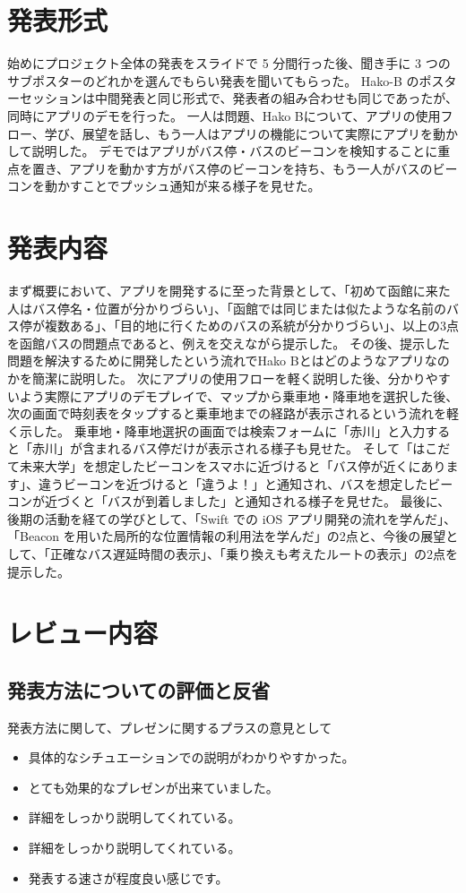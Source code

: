 \documentclass[openany,11pt,papersize]{jsbook}
\begin{document}
\section{発表形式}
始めにプロジェクト全体の発表をスライドで 5 分間行った後、聞き手に 3 つのサブポスターのどれかを選んでもらい発表を聞いてもらった。
Hako-B のポスターセッションは中間発表と同じ形式で、発表者の組み合わせも同じであったが、同時にアプリのデモを行った。
一人は問題、Hako Bについて、アプリの使用フロー、学び、展望を話し、もう一人はアプリの機能について実際にアプリを動かして説明した。
デモではアプリがバス停・バスのビーコンを検知することに重点を置き、アプリを動かす方がバス停のビーコンを持ち、もう一人がバスのビーコンを動かすことでプッシュ通知が来る様子を見せた。


\section{発表内容}
まず概要において、アプリを開発するに至った背景として、「初めて函館に来た人はバス停名・位置が分かりづらい」、「函館では同じまたは似たような名前のバス停が複数ある」、「目的地に行くためのバスの系統が分かりづらい」、以上の3点を函館バスの問題点であると、例えを交えながら提示した。
その後、提示した問題を解決するために開発したという流れでHako Bとはどのようなアプリなのかを簡潔に説明した。
次にアプリの使用フローを軽く説明した後、分かりやすいよう実際にアプリのデモプレイで、マップから乗車地・降車地を選択した後、次の画面で時刻表をタップすると乗車地までの経路が表示されるという流れを軽く示した。
乗車地・降車地選択の画面では検索フォームに「赤川」と入力すると「赤川」が含まれるバス停だけが表示される様子も見せた。
そして「はこだて未来大学」を想定したビーコンをスマホに近づけると「バス停が近くにあります」、違うビーコンを近づけると「違うよ！」と通知され、バスを想定したビーコンが近づくと「バスが到着しました」と通知される様子を見せた。
最後に、後期の活動を経ての学びとして、「Swift での iOS アプリ開発の流れを学んだ」、「Beacon を用いた局所的な位置情報の利用法を学んだ」の2点と、今後の展望として、「正確なバス遅延時間の表示」、「乗り換えも考えたルートの表示」の2点を提示した。


\section{レビュー内容}
\subsection{発表方法についての評価と反省}
発表方法に関して、プレゼンに関するプラスの意見として
\begin{itemize}

\item 具体的なシチュエーションでの説明がわかりやすかった。
\item とても効果的なプレゼンが出来ていました。
\item 詳細をしっかり説明してくれている。
\item 詳細をしっかり説明してくれている。
\item 発表する速さが程度良い感じです。

\end{itemize}
\end{document}
